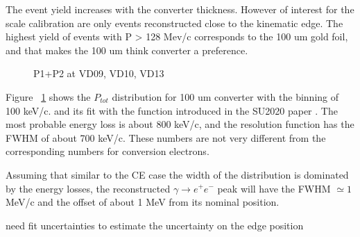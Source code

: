 The event yield increases with the converter thickness. However of interest for the scale calibration
are only events reconstructed close to the kinematic edge. 
The highest yield of events with P > 128 Mev/c corresponds to the 100 um gold foil,
and that makes the 100 um think converter a preference.

\begin{figure}[H]
  \caption{
    \label{figure:sum_mom_vd09_10_13}
    P1+P2 at VD09, VD10, VD13
  }
\end{figure}

Figure ~\ref{figure:sum_mom_vd09_10_13} shows the $P_{tot}$ distribution for 100 um converter
with the binning of 100 keV/c. and its fit with the function introduced
in the SU2020 paper \cite{SU2020_PAPER}. The most probable energy loss is about 800 keV/c, 
and the resolution function has the FWHM of about 700 keV/c.
These numbers are not very different from the corresponding numbers for conversion electrons.

Assuming that similar to the CE case the width of the distribution is dominated by the energy losses,
the reconstructed $\gamma \to e^+e^-$ peak will have the FWHM $\simeq 1$ MeV/c and the offset
of about 1 MeV from its nominal position.

{\red need fit uncertainties to estimate the uncertainty on the edge position }

